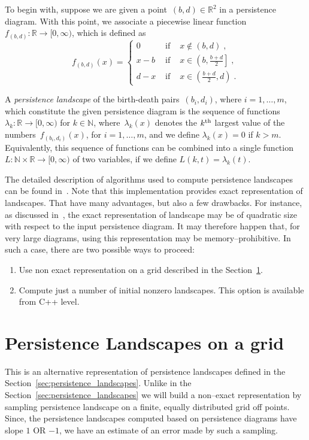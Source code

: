 \documentclass[11pt]{article}
\begin{document}
To begin with, suppose we are given a point~$(b,d) \in \mathbb{R}^2$ in a
persistence diagram. With this point, we associate a piecewise
linear function~$f_{(b,d)} : \mathbb{R} \rightarrow [0,\infty)$, which is
defined as
%
\begin{equation} \label{eq:basicLand}
  f_{(b,d)}(x) =
  \left\{ \begin{array}{ccl}
            0     & \mbox{ if } & x \not\in (b, d) \; , \\[2ex]
            x - b & \mbox{ if } & x \in \left( b, \frac{b+d}{2}
              \right] \; , \\[2ex]
            d - x & \mbox{ if } & x \in \left(\frac{b+d}{2},
              d \right) \; .
  \end{array} \right.
\end{equation}

A \emph{persistence landscape} of the birth-death
pairs~$(b_i , d_i)$, where $i = 1,\ldots,m$, which constitute the given
persistence diagram is the sequence of functions $\lambda_k : \mathbb{R}
\rightarrow [0,\infty)$ for $k \in \mathbb{N}$, where~$\lambda_k(x)$
denotes the $k^{\rm th}$ largest value of the numbers~$f_{(b_i,d_i)}(x)$,
for $i = 1, \ldots, m$, and we define $\lambda_k(x) = 0$ if $k > m$.
Equivalently, this sequence of functions can be combined into a single
function $L : \mathbb{N} \times \mathbb{R} \to [0,\infty)$ of two
variables, if we define $L(k,t) = \lambda_k(t)$.

The detailed description of algorithms used to compute persistence landscapes can be found in~\cite{landscapes2}. Note that this implementation provides exact representation of landscapes. That have many advantages, but also a few drawbacks. For instance, as discussed in~\cite{landscapes2}, the exact representation of landscape may be of quadratic size with respect to the input persistence diagram. It may therefore happen that, for very large diagrams, using this representation may be memory--prohibitive. In such a case, there are two possible ways to proceed:
\begin{enumerate}
\item Use non exact representation on a grid described in the Section~\ref{sec:landscapes_on_grid}.
\item Compute just a number of initial nonzero landscapes. This option is available from C++ level. 
\end{enumerate}



\section{Persistence Landscapes on a grid}
\label{sec:landscapes_on_grid}
This is an alternative representation of persistence landscapes defined in the Section~\ref{sec:persistence_landscapes}. Unlike in the Section~\ref{sec:persistence_landscapes} we will build a non--exact representation by sampling persistence landscape on a finite, equally distributed grid off points. Since, the persistence landscapes computed based on persistence diagrams have slope $1$ OR $-1$, we have an estimate of an error made by such a sampling. 
\end{document}

